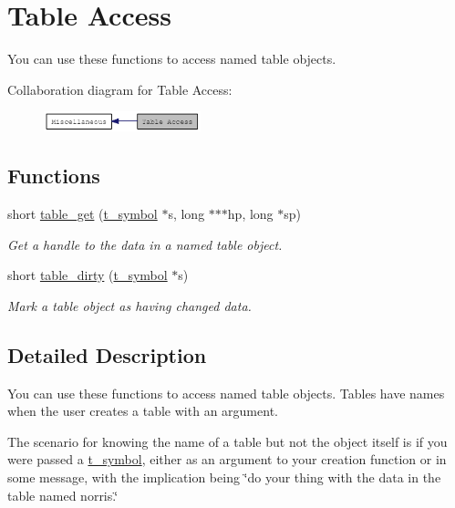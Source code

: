 \hypertarget{group__tables}{
\section{Table Access}
\label{group__tables}
}


You can use these functions to access named table objects.  


Collaboration diagram for Table Access:\nopagebreak
\begin{figure}[H]
\begin{center}
\leavevmode
\includegraphics[width=129pt]{group__tables}
\end{center}
\end{figure}
\subsection*{Functions}
\begin{DoxyCompactItemize}
\item 
short \hyperlink{group__tables_ga2c08d1383a235eb8c106c0f3afea6d21}{table\_\-get} (\hyperlink{structt__symbol}{t\_\-symbol} $\ast$s, long $\ast$$\ast$$\ast$hp, long $\ast$sp)
\begin{DoxyCompactList}\small\item\em Get a handle to the data in a named table object. \item\end{DoxyCompactList}\item 
short \hyperlink{group__tables_gaa72449d4792a6108489ef63c5f5ba7a3}{table\_\-dirty} (\hyperlink{structt__symbol}{t\_\-symbol} $\ast$s)
\begin{DoxyCompactList}\small\item\em Mark a table object as having changed data. \item\end{DoxyCompactList}\end{DoxyCompactItemize}


\subsection{Detailed Description}
You can use these functions to access named table objects. Tables have names when the user creates a table with an argument.

The scenario for knowing the name of a table but not the object itself is if you were passed a \hyperlink{structt__symbol}{t\_\-symbol}, either as an argument to your creation function or in some message, with the implication being \char`\"{}do your 
	thing with the data in the table named norris.\char`\"{} 

